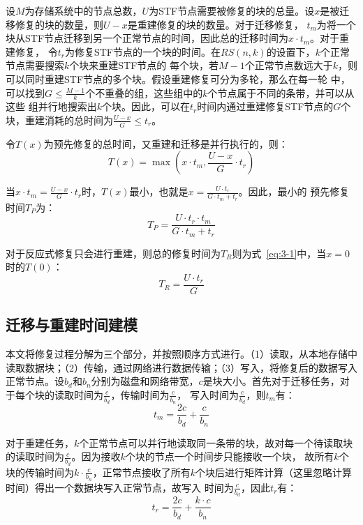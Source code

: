 设$M$为存储系统中的节点总数，$U$为STF节点需要被修复的块的总量。设$x$是被迁移修复的块的数量，则$U-x$是重建修复的块的数量。对于迁移修复，
$t_m$为将一个块从STF节点迁移到另一个正常节点的时间，因此总的迁移时间为$x \cdot t_m $。对于重建修复，
令$t_r$为修复STF节点的一个块的时间。在$RS(n,k)$的设置下，$k$个正常节点需要搜索$k$个块来重建STF节点的
每个块，若$M-1$个正常节点数远大于$k$，则可以同时重建STF节点的多个块。假设重建修复可分为多轮，那么在每一轮
中，可以找到$G\leqslant \frac{M-1}{k}$个不重叠的组，这些组中的$k$个节点属于不同的条带，并可以从这些
组并行地搜索出$k$个块。因此，可以在$t_r$时间内通过重建修复STF节点的$G$个块，重建消耗的总时间为$\frac{U-x}{G} \leqslant t_r$。

令$T(x)$为预先修复的总时间，又重建和迁移是并行执行的，则：
\begin{equation}
	\label{eq:3-1}
	T(x)=\max \left(x \cdot t_{m}, \frac{U-x}{G} \cdot t_{r}\right)
\end{equation}

当$x \cdot t_m = \frac{U-x}{G} \cdot t_r$时，$T(x)$最小，也就是$x = \frac{U \cdot t_{r}}{G \cdot t_{m}+t_{r}}$。因此，最小的
预先修复时间$T_P$为：
\begin{equation}
	\label{eq:3-2}
	T_{P}=\frac{U \cdot t_{r} \cdot t_{m}}{G \cdot t_{m}+t_{r}}
\end{equation}

对于反应式修复只会进行重建，则总的修复时间为$T_R$则为式~\ref{eq:3-1}中，当$x=0$时的$T(0)$：
\begin{equation}
	\label{eq:3-3}
	T_{R}=\frac{U \cdot t_{r}}{G}
\end{equation}

\subsection{迁移与重建时间建模}
本文将修复过程分解为三个部分，并按照顺序方式进行。（1）读取，从本地存储中读取数据块；（2）传输，通过网络进行数据传输；（3）写入，将修复后的数据写入
正常节点。设$b_d$和$b_n$分别为磁盘和网络带宽，$c$是块大小。首先对于迁移任务，对于每个块的读取时间为$\frac{c}{b_d}$，传输时间为$\frac{c}{b_n}$，
写入时间为$\frac{c}{b_d}$，则$t_m$有：
\begin{equation}
	\label{eq:3-4}
	t_{m}=\frac{2c}{b_{d}}+\frac{c}{b_{n}}
\end{equation}

对于重建任务，$k$个正常节点可以并行地读取同一条带的块，故对每一个待读取块的读取时间为$\frac{c}{b_d}$。因为接收$k$个块的节点一个时间步只能接收一个块，
故所有$k$个块的传输时间为$k \cdot \frac{c}{b_n}$，正常节点接收了所有$k$个块后进行矩阵计算（这里忽略计算时间）得出一个数据块写入正常节点，故写入
时间为$\frac{c}{b_d}$，因此$t_r$有：
\begin{equation}
	\label{eq:3-5}
	t_{r}=\frac{2c}{b_{d}}+\frac{k \cdot c}{b_{n}}
\end{equation}

